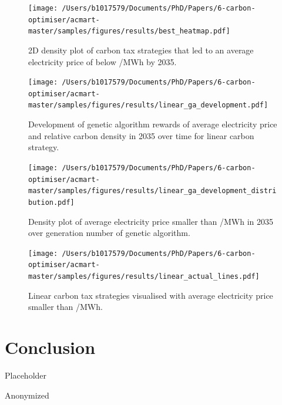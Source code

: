 \documentclass[sigconf]{acmart}
\begin{document}
\begin{figure}
\centering
\texttt{[image: /Users/b1017579/Documents/PhD/Papers/6-carbon-optimiser/acmart-master/samples/figures/results/best\_heatmap.pdf]}
\caption{2D density plot of carbon tax strategies that led to an average electricity price of below /MWh by 2035.}
\label{fig:forward_scenario_best_pdcs}
\end{figure}


\begin{figure}
\centering
\texttt{[image: /Users/b1017579/Documents/PhD/Papers/6-carbon-optimiser/acmart-master/samples/figures/results/linear\_ga\_development.pdf]}
\caption{Development of genetic algorithm rewards of average electricity price and relative carbon density in 2035 over time for linear carbon strategy.}
\label{fig:forward_scenario_best_pdcs}
\end{figure}


\begin{figure}
\centering
\texttt{[image: /Users/b1017579/Documents/PhD/Papers/6-carbon-optimiser/acmart-master/samples/figures/results/linear\_ga\_development\_distribution.pdf]}
\caption{Density plot of average electricity price smaller than /MWh in 2035 over generation number of genetic algorithm.}
\label{fig:forward_scenario_best_pdcs}
\end{figure}



\begin{figure}
\centering
\texttt{[image: /Users/b1017579/Documents/PhD/Papers/6-carbon-optimiser/acmart-master/samples/figures/results/linear\_actual\_lines.pdf]}
\caption{Linear carbon tax strategies visualised with average electricity price smaller than /MWh.}
\label{fig:forward_scenario_best_pdcs}
\end{figure}



\section{Conclusion}
\label{sec:conclusion}
Placeholder




\begin{acks}
Anonymized
\end{acks}




\appendix
\end{document}
